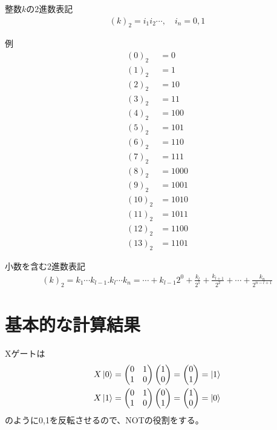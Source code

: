 \documentclass[]{ltjsarticle}
\begin{document}
整数$k$の2進数表記
\begin{align}
    (k)_2 = i_1 i_2 \cdots, \quad i_n = 0, 1
\end{align}

例
\begin{align}
    (0)_2 &= 0 \\
    (1)_2 &= 1 \\
    (2)_2 &= 10 \\
    (3)_2 &= 11 \\
    (4)_2 &= 100 \\
    (5)_2 &= 101 \\
    (6)_2 &= 110 \\
    (7)_2 &= 111 \\
    (8)_2 &= 1000 \\
    (9)_2 &= 1001 \\
    (10)_2 &= 1010 \\
    (11)_2 &= 1011 \\
    (12)_2 &= 1100 \\
    (13)_2 &= 1101
\end{align}

小数を含む2進数表記
\begin{align}
    (k)_2 
    =
    k_1 \cdots k_{l-1}. k_l \cdots k_n
    =
    \cdots + k_{l-1} 2^{0}
    +
    \frac{k_l}{2^1}
    +
    \frac{k_{l+1}}{2^2}
    +
    \cdots
    +
    \frac{k_n}{2^{n-l+1}}
\end{align}


\section{基本的な計算結果}
Xゲートは
\begin{align}
    X\ket{0} 
    &=
    \begin{pmatrix}
        0 & 1 \\ 1 & 0 
    \end{pmatrix} 
    \begin{pmatrix}
        1 \\ 0 
    \end{pmatrix} 
    =
    \begin{pmatrix}
        0 \\ 1 
    \end{pmatrix}
    =
    \ket{1}  \\
    X\ket{1} 
    &=
    \begin{pmatrix}
        0 & 1 \\ 1 & 0 
    \end{pmatrix} 
    \begin{pmatrix}
        0 \\ 1 
    \end{pmatrix} 
    =
    \begin{pmatrix}
        1 \\ 0 
    \end{pmatrix}
    =
    \ket{0}
\end{align}
のように0,1を反転させるので、NOTの役割をする。
\end{document}
